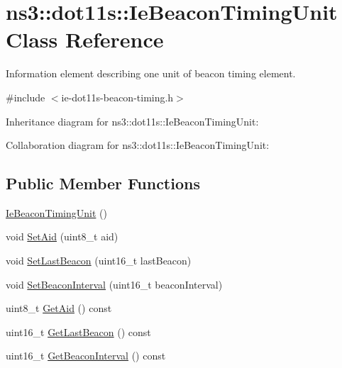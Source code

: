 \hypertarget{classns3_1_1dot11s_1_1IeBeaconTimingUnit}{}\section{ns3\+:\+:dot11s\+:\+:Ie\+Beacon\+Timing\+Unit Class Reference}
\label{classns3_1_1dot11s_1_1IeBeaconTimingUnit}


Information element describing one unit of beacon timing element.  




{\ttfamily \#include $<$ie-\/dot11s-\/beacon-\/timing.\+h$>$}



Inheritance diagram for ns3\+:\+:dot11s\+:\+:Ie\+Beacon\+Timing\+Unit\+:


Collaboration diagram for ns3\+:\+:dot11s\+:\+:Ie\+Beacon\+Timing\+Unit\+:
\subsection*{Public Member Functions}
\begin{DoxyCompactItemize}
\item 
\hyperlink{classns3_1_1dot11s_1_1IeBeaconTimingUnit_aa87d9e9791a8eafe8811a986964e2dd1}{Ie\+Beacon\+Timing\+Unit} ()
\item 
void \hyperlink{classns3_1_1dot11s_1_1IeBeaconTimingUnit_aa283a62ba3ad5207d22e2ba707f34339}{Set\+Aid} (uint8\+\_\+t aid)
\item 
void \hyperlink{classns3_1_1dot11s_1_1IeBeaconTimingUnit_aac68b442ef190aed860baa37384a7c9f}{Set\+Last\+Beacon} (uint16\+\_\+t last\+Beacon)
\item 
void \hyperlink{classns3_1_1dot11s_1_1IeBeaconTimingUnit_a6a1ad0a8e9b4642fdad2cabec744206e}{Set\+Beacon\+Interval} (uint16\+\_\+t beacon\+Interval)
\item 
uint8\+\_\+t \hyperlink{classns3_1_1dot11s_1_1IeBeaconTimingUnit_a259e0f00ac4f00f88e9ad90b27ea380d}{Get\+Aid} () const 
\item 
uint16\+\_\+t \hyperlink{classns3_1_1dot11s_1_1IeBeaconTimingUnit_a481a979535c5bbe141d30058f31251e8}{Get\+Last\+Beacon} () const 
\item 
uint16\+\_\+t \hyperlink{classns3_1_1dot11s_1_1IeBeaconTimingUnit_aba5cd79211b2f68f8bf86a2a58677e75}{Get\+Beacon\+Interval} () const 
\end{DoxyCompactItemize}
